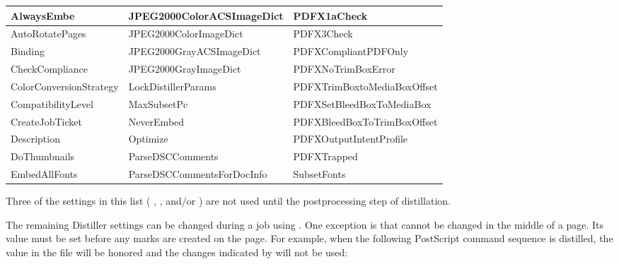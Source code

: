 \documentclass[letterpaper,12pt,english,openany,oneside]{sphinxmanual}
\begin{document}
\begin{savenotes}\sphinxattablestart
\centering
{}\label{\detokenize{index:section-2}}\nobreak
\begin{tabulary}{\linewidth}[t]{|T|T|T|}
\hline

AlwaysEmbe
&
JPEG2000ColorACSImageDict
&
PDFX1aCheck
\\
\hline
AutoRotatePages
&
JPEG2000ColorImageDict
&
PDFX3Check
\\
\hline
Binding
&
JPEG2000GrayACSImageDict
&
PDFXCompliantPDFOnly
\\
\hline
CheckCompliance
&
JPEG2000GrayImageDict
&
PDFXNoTrimBoxError
\\
\hline
ColorConversionStrategy
&
LockDistillerParams
&
PDFXTrimBoxtoMediaBoxOffset
\\
\hline
CompatibilityLevel
&
MaxSubsetPc
&
PDFXSetBleedBoxToMediaBox
\\
\hline
CreateJobTicket
&
NeverEmbed
&
PDFXBleedBoxToTrimBoxOffset
\\
\hline
Description
&
Optimize
&
PDFXOutputIntentProfile
\\
\hline
DoThumbnails
&
ParseDSCComments
&
PDFXTrapped
\\
\hline
EmbedAllFonts
&
ParseDSCCommentsForDocInfo
&
SubsetFonts
\\
\hline
\end{tabulary}
\par
\sphinxattableend\end{savenotes}

Three of the settings in this list ( ,  , and/or  ) are not used until the post\sphinxhyphen{}processing step of distillation.

The remaining Distiller settings can be changed during a job using  . One exception is that  cannot be changed in the middle of a page. Its value must be set before any marks are created on the page. For example, when the following PostScript command sequence is distilled, the value in the  file will be honored and the changes indicated by  will not be used:

\begin{sphinxVerbatim}[commandchars=\\\{\}]
     
    
  
\end{sphinxVerbatim}
\end{document}
